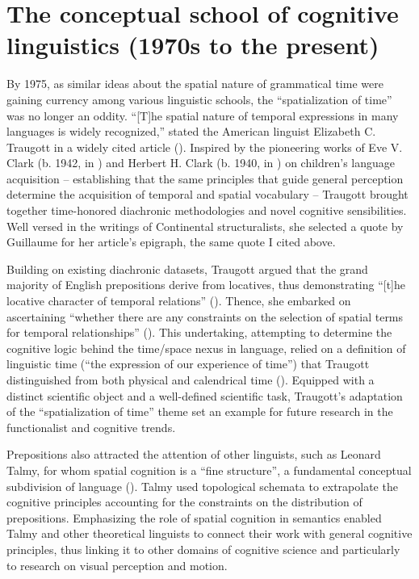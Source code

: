 \documentclass[english,output=paper,colorlinks,citecolor=brown]{../langscibook}
\begin{document}
\section{The conceptual school of cognitive linguistics (1970s to the present)}

By 1975, as similar ideas about the spatial nature of grammatical time were gaining currency among various linguistic schools, the “spatialization of time” was no longer an oddity. “[T]he spatial nature of temporal expressions in many languages is widely recognized,” stated the American linguist Elizabeth C. Traugott in a widely cited article (\citeyear[207]{Traugott1975}). Inspired by the pioneering works of Eve V. Clark (b. 1942, in \citeyear{Clark1971}) and Herbert H. Clark (b. 1940, in \citeyear{Clark1973}) on children’s language acquisition -- establishing that the same principles that guide general perception determine the acquisition of temporal and spatial vocabulary -- Traugott brought together time-honored diachronic methodologies and novel cognitive sensibilities. Well versed in the writings of Continental structuralists, she selected a quote by Guillaume for her article’s epigraph, the same quote I cited above.

Building on existing diachronic datasets, Traugott argued that the grand majority of English prepositions derive from locatives, thus demonstrating “[t]he locative character of temporal relations” (\citeyear[209]{Traugott1975}). Thence, she embarked on ascertaining “whether there are any constraints on the selection of spatial terms for temporal relationships” (\citeyear[207]{Traugott1975}). This undertaking, attempting to determine the cognitive logic behind the time/space nexus in language, relied on a definition of linguistic time (“the expression of our experience of time”) that Traugott distinguished from both physical and calendrical time (\citeyear[207]{Traugott1975}). Equipped with a distinct scientific object and a well-defined scientific task, Traugott’s adaptation of the “spatialization of time” theme set an example for future research in the functionalist and cognitive trends. 

Prepositions also attracted the attention of other linguists, such as Leonard Talmy, for whom spatial cognition is a “fine structure”, a fundamental conceptual subdivision of language (\citeyear[225]{Talmy1983}). Talmy used topological schemata to extrapolate the cognitive principles accounting for the constraints on the distribution of prepositions. Emphasizing the role of spatial cognition in semantics enabled Talmy and other theoretical linguists to connect their work with general cognitive principles, thus linking it to other domains of cognitive science and particularly to research on visual perception and motion. 
\end{document}
